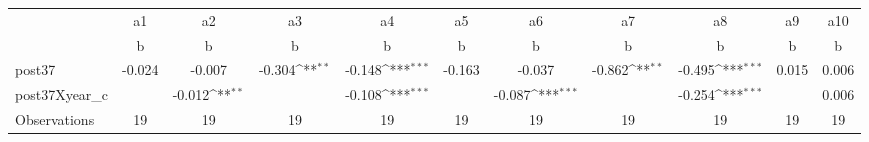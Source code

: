 {
\def\sym#1{\ifmmode^{#1}\else\(^{#1}\)\fi}
\begin{tabular}{l*{10}{c}}
\toprule
                    &          a1         &          a2         &          a3         &          a4         &          a5         &          a6         &          a7         &          a8         &          a9         &         a10         \\
                    &           b         &           b         &           b         &           b         &           b         &           b         &           b         &           b         &           b         &           b         \\
\midrule
post37              &      -0.024         &      -0.007         &      -0.304\sym{**} &      -0.148\sym{***}&      -0.163         &      -0.037         &      -0.862\sym{**} &      -0.495\sym{***}&       0.015         &       0.006         \\
post37Xyear\_c       &                     &      -0.012\sym{**} &                     &      -0.108\sym{***}&                     &      -0.087\sym{***}&                     &      -0.254\sym{***}&                     &       0.006         \\
\midrule
Observations        &          19         &          19         &          19         &          19         &          19         &          19         &          19         &          19         &          19         &          19         \\
\bottomrule
\end{tabular}
}
